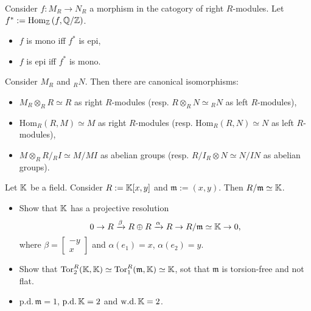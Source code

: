 \begin{lem}
	Consider $f: M_R \to N_R$ a morphism in the catogory of right $R$-modules.
	Let $f^* := \mathrm{Hom}_{\mathbb{Z}}\left( f, \mathbb{Q}/\mathbb{Z} \right)$.
	\begin{itemize}
		\item $f$ is mono iff $f^*$ is epi,
		\item $f$ is epi iff $f^*$ is mono.
	\end{itemize}
\end{lem} 

\begin{lem}
	Consider $M_R$ and ${}_RN$. Then there are canonical isomorphisms:
	\begin{itemize}
		\item $M_R \otimes_R R \simeq R$ as right $R$-modules 
			(resp. $R \otimes_R N \simeq {}_RN$ as left $R$-modules),
		\item $\mathrm{Hom}_{ R}\left( R, M \right) \simeq M$ as right $R$-modules
			(resp. $\mathrm{Hom}_{ R}\left( R, N \right) \simeq N$ as left $R$-modules),
		\item $M \otimes_R R/{}_RI \simeq M/MI$ as abelian groups
			(resp. $R/I_R \otimes N \simeq N/IN$ as abelian groups).
	\end{itemize}
\end{lem} 

\begin{lem}
	Let $\mathbb{K}$ be a field.
	Consider $R := \mathbb{K}[x,y]$ and $\mathfrak{m} := (x,y)$.
	Then $R/\mathfrak{m} \simeq \mathbb{K}$.
	\begin{itemize}
		\item Show that $\mathbb{K}$ has a projective resolution
			\begin{equation}
			0 \to R \xrightarrow{\beta} R \oplus R \xrightarrow{\alpha} R \to
			R/\mathfrak{m} \simeq \mathbb{K} \to 0
			,\end{equation} 
			where $\beta = \begin{bmatrix}-y \\ x\end{bmatrix}$ and $\alpha(e_1) = x$, $\alpha(e_2) = y$.
		\item Show that $\mathrm{Tor}^R_2(\mathbb{K},\mathbb{K}) \simeq \mathrm{Tor}^R_1(\mathfrak{m}, \mathbb{K}) \simeq \mathbb{K}$,
			sot that $\mathfrak{m}$ is torsion-free and not flat.
		\item $\mathrm{p.d.}\, \mathfrak{m} = 1$, $\mathrm{p.d.}\, \mathbb{K} = 2$
			and $\mathrm{w.d.}\, \mathbb{K} = 2$.
	\end{itemize}
\end{lem} 

